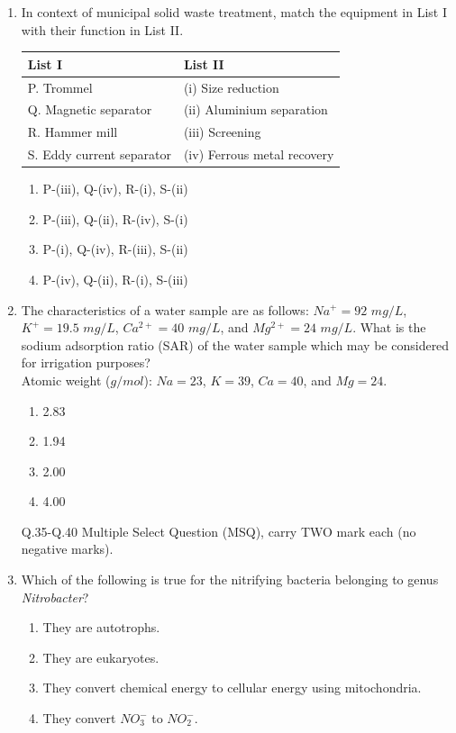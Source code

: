 \documentclass[journal]{IEEEtran}
\begin{document}
\begin{enumerate}[start=1]
\item In context of municipal solid waste treatment, match the equipment in List I with their function in List II. \hfill{}
\begin{table}[H]
\centering
\renewcommand{\arraystretch}{1.3} %
\begin{tabular}{|l|l|}
\hline
List I & List II \\ \hline
P. Trommel & (i) Size reduction \\ \hline
Q. Magnetic separator & (ii) Aluminium separation \\ \hline
R. Hammer mill & (iii) Screening \\ \hline
S. Eddy current separator & (iv) Ferrous metal recovery \\ \hline
\end{tabular}
\end{table}
\begin{enumerate}
    \item P-(iii), Q-(iv), R-(i), S-(ii)
    \item P-(iii), Q-(ii), R-(iv), S-(i)
    \item P-(i), Q-(iv), R-(iii), S-(ii)
    \item P-(iv), Q-(ii), R-(i), S-(iii)

\end{enumerate}

\item The characteristics of a water sample are as follows: $Na^+ = 92$ $mg/L$, $K^+ = 19.5$ $mg/L$, $Ca^{2+} = 40$ $mg/L$, and $Mg^{2+} = 24$ $mg/L$. What is the sodium adsorption ratio (SAR) of the water sample which may be considered for irrigation purposes?\\
Atomic weight ($g/mol$): $Na = 23$, $K = 39$, $Ca = 40$, and $Mg = 24$. \hfill{}
\begin{enumerate}
    \item 2.83
    \item 1.94
    \item 2.00
    \item 4.00
\end{enumerate}
\bigskip

Q.35-Q.40 Multiple Select Question (MSQ), carry TWO mark each (no negative marks).\\

\item Which of the following is true for the nitrifying bacteria belonging to genus \textit{Nitrobacter}? \hfill{}
\begin{enumerate}
    \item They are autotrophs.
    \item They are eukaryotes.
    \item They convert chemical energy to cellular energy using mitochondria.
    \item They convert $NO_3^-$ to $NO_2^-$.
\end{enumerate}


\end{enumerate}
\end{document}
